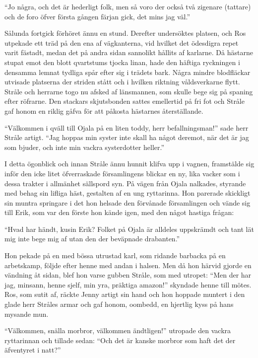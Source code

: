 ``Jo några, och det är hederligt folk, men så voro der också två
zigenare (tattare) och de foro öfver första gången färjan gick, det mins
jag väl.''

Sålunda fortgick förhöret ännu en stund. Derefter undersöktes platsen,
och Ros utpekade ett träd på den ena af vägkanterna, vid hvilket det
ödesdigra repet varit fästadt, medan det på andra sidan sannolikt
hållits af karlarne. Då hästarne stupat emot den blott qvartstums tjocka
linan, hade den häftiga ryckningen i densamma lemnat tydliga spår efter
sig i trädets bark. Några mindre blodfläckar utvisade platserna der
striden stått och i hvilken riktning våldsverkarne flytt. Stråle och
herrarne togo nu afsked af länsmannen, som skulle bege sig på spaning
efter röfrarne. Den stackars skjutsbonden sattes emellertid på fri fot
och Stråle gaf honom en riklig gåfva för att påkosta hästarnes
återställande.

``Välkommen i qväll till Ojala på en liten toddy, herr befallningsman!''
sade herr Stråle artigt. ``Jag hoppas min syster inte skall ha något
deremot, när det är jag som bjuder, och inte min vackra systerdotter
heller.''

I detta ögonblick och innan Stråle ännu hunnit klifva upp i vagnen,
framstälde sig inför den icke litet öfverraskade församlingens blickar
en ny, lika vacker som i dessa trakter i allmänhet sällspord syn. På
vägen från Ojala nalkades, styrande med behag sin lifliga häst,
gestalten af en ung ryttarinna. Hon parerade skickligt sin muntra
springare i det hon helsade den förvånade församlingen och vände sig
till Erik, som var den förste hon kände igen, med den något hastiga
frågan:

``Hvad har händt, kusin Erik? Folket på Ojala är alldeles uppskrämdt och
tant lät mig inte bege mig af utan den der beväpnade drabanten.''

Hon pekade på en med bössa utrustad karl, som ridande barbacka på en
arbetskamp, följde efter henne med andan i halsen. Men då hon härvid
gjorde en vändning åt sidan, blef hon varse gubben Stråle, som med
utropet: ``Men der har jag, minsann, henne sjelf, min yra, präktiga
amazon!'' skyndade henne till mötes. Ros, som sutit af, räckte Jenny
artigt sin hand och hon hoppade muntert i den glade herr Stråles armar
och gaf honom, oombedd, en hjertlig kyss på hans mysande mun.

``Välkommen, snälla morbror, välkommen ändtligen!'' utropade den vackra
ryttarinnan och tillade sedan: ``Och det är kanske morbror som haft det
der äfventyret i natt?''

